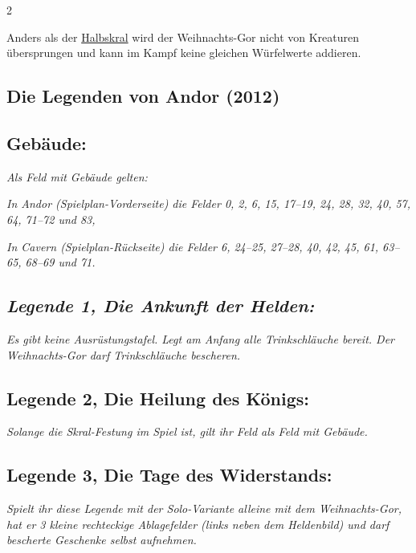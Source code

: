 \documentclass[10pt, a4paper, oneside]{book}
\newcommand{\fan}[1]{\textit{#1}}
\begin{document}
\begin{multicols*}{2}
\begin{nobgcolor}
Anders als der \hyperref[halbskral]{Halbskral} wird der Weihnachts-Gor nicht von Kreaturen übersprungen und kann im Kampf keine gleichen Würfelwerte addieren.







\end{nobgcolor}


\begin{bgcolor}
\section{Die Legenden von Andor (2012)}

\subsection{Gebäude:}

\fan{Als Feld mit Gebäude gelten:}

\bullet{} \fan{In Andor (Spielplan-Vorderseite) die Felder 0, 2, 6, 15, 17–19, 24, 28, 32, 40, 57, 64, 71–72 und 83,}

\bullet{} \fan{In Cavern (Spielplan-Rückseite) die Felder 6, 24–25, 27–28, 40, 42, 45, 61, 63–65, 68–69 und 71.}


\subsection{\fan{Legende 1, Die Ankunft der Helden:}}

\fan{Es gibt keine Ausrüstungstafel. Legt am Anfang alle Trinkschläuche bereit. Der Weihnachts-Gor darf Trinkschläuche bescheren.}




\subsection{Legende 2, Die Heilung des Königs:}


\fan{Solange die Skral-Festung im Spiel ist, gilt ihr Feld als Feld mit Gebäude.}


\subsection{Legende 3, Die Tage des Widerstands:}

\fan{Spielt ihr diese Legende mit der Solo-Variante alleine mit dem Weihnachts-Gor, hat er 3 kleine rechteckige Ablagefelder (links neben dem Heldenbild) und darf bescherte Geschenke selbst aufnehmen.}



\end{bgcolor}
\end{multicols*}
\end{document}
